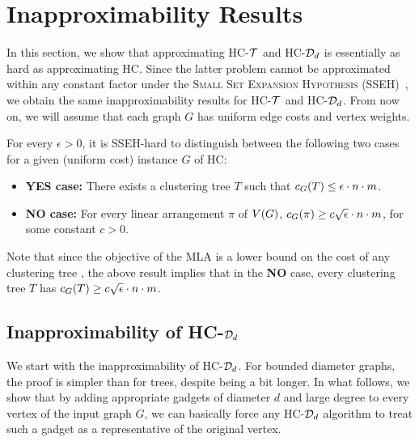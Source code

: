 \section{Inapproximability Results}
In this section, we show that approximating \textsc{HC-$\mathcal{T}$} and \textsc{HC-$\mathcal{D}_d$} is essentially as hard as approximating \textsc{HC}. Since the latter problem cannot be approximated within any constant factor under the \textsc{Small Set Expansion Hypothesis} (\textsc{SSEH})~\cite{GraphExpansionAndTheUniqueGamesConjecture}, we obtain the same inapproximability results for \textsc{HC-$\mathcal{T}$} and \textsc{HC-$\mathcal{D}_d$}. From now on, we will assume that each graph $G$ has uniform edge costs and vertex weights.

\begin{theorem}\label{thm:hc-inapproximability}
    For every $\epsilon > 0$, it is \textsc{SSEH}-hard to distinguish between the following two cases for a given (uniform cost) instance $G$ of \textsc{HC}:
    \begin{itemize}
        \item \textbf{YES case:} There exists a clustering tree $T$ such that ${c}_G\mathopen{}\left( T \right)\leq \epsilon \cdot n \cdot m$.
        \item \textbf{NO case:} For every linear arrangement $\pi$ of $V\mathopen{}\left( G \right)$, ${c}_G\mathopen{}\left( \pi \right)\geq c\sqrt{\epsilon} \cdot n \cdot m$, for some constant $c > 0$.
    \end{itemize}
\end{theorem}
Note that since the objective of the
 \textsc{MLA} is a lower bound on the cost of any clustering tree \cite{ApproximateHierarchicalClusteringViaSparsestCutAndSpreadingMetrics}, the above result implies that in the \textbf{NO} case, every clustering tree $T$ has ${c}_G\mathopen{}\left( T \right)\geq c\sqrt{\epsilon} \cdot n \cdot m$.

\subsection{Inapproximability of \textsc{HC-$\mathcal{D}_d$}}

We start with the inapproximability of \textsc{HC-$\mathcal{D}_d$}. For bounded diameter graphs, the proof is simpler than for trees, despite being a bit longer. In what follows, we show that by adding appropriate gadgets of diameter $d$ and large degree to every vertex of the input graph $G$, we can basically force any \textsc{HC-$\mathcal{D}_d$} algorithm to treat such a gadget as a representative of the original vertex. 

